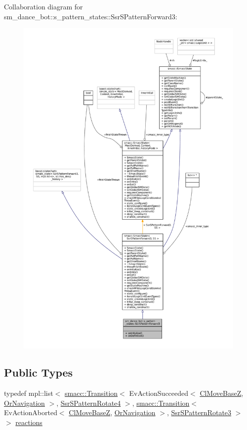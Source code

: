Collaboration diagram for sm\+\_\+dance\+\_\+bot\+:\+:s\+\_\+pattern\+\_\+states\+:\+:Ssr\+S\+Pattern\+Forward3\+:
\nopagebreak
\begin{figure}[H]
\begin{center}
\leavevmode
\includegraphics[width=350pt]{structsm__dance__bot_1_1s__pattern__states_1_1SsrSPatternForward3__coll__graph}
\end{center}
\end{figure}
\subsection*{Public Types}
\begin{DoxyCompactItemize}
\item 
typedef mpl\+::list$<$ \hyperlink{classsmacc_1_1Transition}{smacc\+::\+Transition}$<$ Ev\+Action\+Succeeded$<$ \hyperlink{classmove__base__z__client_1_1ClMoveBaseZ}{Cl\+Move\+BaseZ}, \hyperlink{classsm__dance__bot_1_1OrNavigation}{Or\+Navigation} $>$, \hyperlink{structsm__dance__bot_1_1s__pattern__states_1_1SsrSPatternRotate4}{Ssr\+S\+Pattern\+Rotate4} $>$, \hyperlink{classsmacc_1_1Transition}{smacc\+::\+Transition}$<$ Ev\+Action\+Aborted$<$ \hyperlink{classmove__base__z__client_1_1ClMoveBaseZ}{Cl\+Move\+BaseZ}, \hyperlink{classsm__dance__bot_1_1OrNavigation}{Or\+Navigation} $>$, \hyperlink{structsm__dance__bot_1_1s__pattern__states_1_1SsrSPatternRotate3}{Ssr\+S\+Pattern\+Rotate3} $>$ $>$ \hyperlink{structsm__dance__bot_1_1s__pattern__states_1_1SsrSPatternForward3_a735f6e220440d80f0e4d488f19654b40}{reactions}
\end{DoxyCompactItemize}

